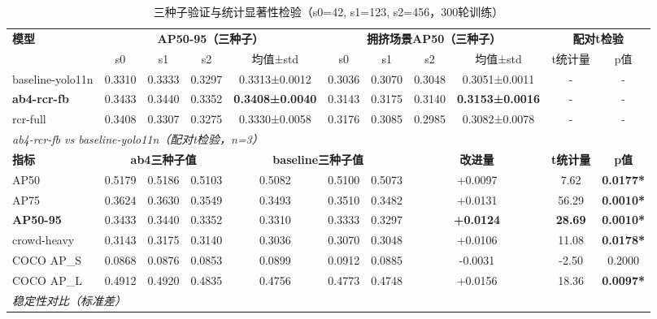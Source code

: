 
\begin{table}[t]
\centering
\caption{三种子验证与统计显著性检验（s0=42, s1=123, s2=456，300轮训练）}
\label{tab:three_seed}
\begin{tabular}{l|ccc|c|ccc|c|cc}
\hline
\multirow{2}{*}{\textbf{模型}} & \multicolumn{4}{c|}{\textbf{AP50-95（三种子）}} & \multicolumn{4}{c|}{\textbf{拥挤场景AP50（三种子）}} & \multicolumn{2}{c}{\textbf{配对t检验}} \\
& s0 & s1 & s2 & 均值±std & s0 & s1 & s2 & 均值±std & t统计量 & p值 \\
\hline
\hline
baseline-yolo11n & 0.3310 & 0.3333 & 0.3297 & 0.3313±0.0012 & 0.3036 & 0.3070 & 0.3048 & 0.3051±0.0011 & - & - \\
\textbf{ab4-rcr-fb} & 0.3433 & 0.3440 & 0.3352 & \textbf{0.3408±0.0040} & 0.3143 & 0.3175 & 0.3140 & \textbf{0.3153±0.0016} & - & - \\
rcr-full & 0.3408 & 0.3307 & 0.3275 & 0.3330±0.0058 & 0.3176 & 0.3085 & 0.2985 & 0.3082±0.0078 & - & - \\
\hline
\hline
\multicolumn{11}{l}{\textit{ab4-rcr-fb vs baseline-yolo11n（配对t检验，n=3）}} \\
\hline
\textbf{指标} & \multicolumn{3}{c|}{\textbf{ab4三种子值}} & \multicolumn{3}{c|}{\textbf{baseline三种子值}} & \multicolumn{2}{c|}{\textbf{改进量}} & \textbf{t统计量} & \textbf{p值} \\
\hline
AP50 & 0.5179 & 0.5186 & 0.5103 & 0.5082 & 0.5100 & 0.5073 & \multicolumn{2}{c|}{+0.0097} & 7.62 & \textbf{0.0177*} \\
AP75 & 0.3624 & 0.3630 & 0.3549 & 0.3493 & 0.3510 & 0.3482 & \multicolumn{2}{c|}{+0.0131} & 56.29 & \textbf{0.0010*} \\
\textbf{AP50-95} & 0.3433 & 0.3440 & 0.3352 & 0.3310 & 0.3333 & 0.3297 & \multicolumn{2}{c|}{\textbf{+0.0124}} & \textbf{28.69} & \textbf{0.0010*} \\
crowd-heavy & 0.3143 & 0.3175 & 0.3140 & 0.3036 & 0.3070 & 0.3048 & \multicolumn{2}{c|}{+0.0106} & 11.08 & \textbf{0.0178*} \\
COCO AP\_S & 0.0868 & 0.0876 & 0.0853 & 0.0899 & 0.0912 & 0.0885 & \multicolumn{2}{c|}{-0.0031} & -2.50 & 0.2000 \\
COCO AP\_L & 0.4912 & 0.4920 & 0.4835 & 0.4756 & 0.4773 & 0.4748 & \multicolumn{2}{c|}{+0.0156} & 18.36 & \textbf{0.0097*} \\
\hline
\hline
\multicolumn{11}{l}{\textit{稳定性对比（标准差）}} \\

\end{tabular}
\end{table}
